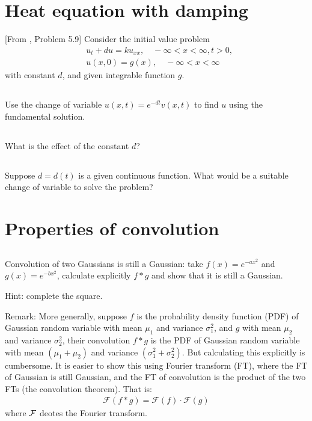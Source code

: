\documentclass[11pt,letterpaper]{report}
\begin{document}
\section{Heat equation with damping}
[From \cite{ShearerLevy_15}, Problem 5.9] Consider the initial value problem
\begin{align}
    &u_t+du = ku_{xx},\quad -\infty<x<\infty, t>0,\\
    &u(x,0) = g(x),\quad -\infty<x<\infty
\end{align}
with constant $d$, and given integrable function $g$.

\subsection{}
Use the change of variable $u(x, t) = e^{-dt}v(x,t)$ to find $u$ using the
fundamental solution.

\subsection{}
What is the effect of the constant $d$?

\subsection{}
Suppose $d = d(t)$ is a given continuous function. What would be a suitable
change of variable to solve the problem?

\section{Properties of convolution}\label{sec:p1}
\subsection{}
Convolution of two Gaussians is still a Gaussian: take $f(x) = e^{-ax^2}$ and $g(x) = e^{-bx^2}$, calculate explicitly $f*g$ and show that it is still a Gaussian.

Hint: complete the square.

Remark: More generally, suppose $f$ is the probability density function (PDF) of Gaussian random variable with mean $\mu_1$ and variance $\sigma_1^2$, and $g$ with mean $\mu_2$ and variance $\sigma_2^2$, their convolution $f*g$ is the PDF of Gaussian random variable with mean $(\mu_1+\mu_2)$ and variance $(\sigma_1^2+\sigma_2^2)$. But calculating this explicitly is cumbersome. It is easier to show this using Fourier transform (FT), where the FT of Gaussian is still Gaussian, and the FT of convolution is the product of the two FTs (the convolution theorem). That is:
\begin{align}
    \mathcal{F}(f*g) = \mathcal{F}(f)\cdot \mathcal{F}(g)
\end{align}
where $\mathcal{F}$ deotes the Fourier transform.
\end{document}
